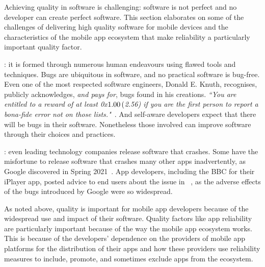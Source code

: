 Achieving quality in software is challenging: software is not perfect and no developer can create perfect software. This section elaborates on some of the challenges of delivering high quality software for mobile devices and the characteristics of the mobile app ecosystem that make reliability a particularly important quality factor.

: it is formed through numerous human endeavours using flawed tools and techniques.
Bugs are ubiquitous in software, and no practical software is bug-free. Even one of the most respected software engineers, Donald E. Knuth, recognises, publicly acknowledges, \emph{and pays for}, bugs found in his creations. %
\emph{``You are entitled to a reward of at least 0x$1.00 \nobreak\hspace{.16667em plus .08333em} ($2.56) if you are the first person to report a \textit{bona-fide} error not on those lists."}~. And self-aware developers expect that there will be bugs in their software. Nonetheless those involved can improve software through their choices and practices.

: even leading technology companies release software that crashes. Some have the misfortune to release software that crashes many other apps inadvertently, as Google discovered in Spring 2021~. App developers, including the BBC for their iPlayer app, posted advice to end users about the issue in ~, as the adverse effects of the bugs introduced by Google were so widespread.

\medskip
As noted above, quality is important for mobile app developers because of the widespread use and impact of their software. Quality factors like app reliability are particularly important because of the way the mobile app ecosystem works. This is because of the developers' dependence on the providers of mobile app platforms for the distribution of their apps and how these providers use reliability measures to include, promote, and sometimes exclude apps from the ecosystem.

